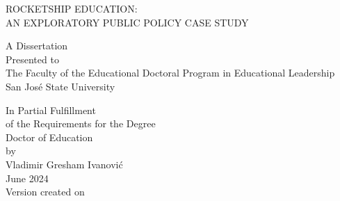 
\begin{vplace}%
\begin{center}

  ROCKETSHIP EDUCATION:\\\vspace{1ex}
  AN EXPLORATORY PUBLIC POLICY CASE STUDY\\
\vspace{2\baselineskip}

A Dissertation\\
Presented to\\
The Faculty of the Educational Doctoral Program in Educational Leadership\\
San José State University\\
\vspace{2\baselineskip}

In Partial Fulfillment\\
of the Requirements for the Degree\\
Doctor of Education\\
\vspace{2\baselineskip}
by\\
Vladimir Gresham Ivanović\\
June 2024\\

\vspace{2\baselineskip}
Version \version{} created on \DTMnow%

\end{center}
\end{vplace}

\thispagestyle{empty}

